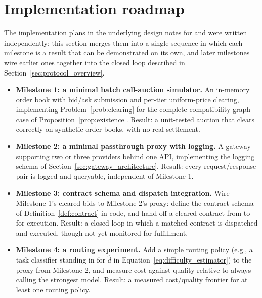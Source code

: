 \section{Implementation roadmap}
\label{sec:roadmap}

The implementation plans in the underlying design notes for
\NoesisMarket{} and \NoesisServer{} were written independently; this
section merges them into a single sequence in which each milestone is a
result that can be demonstrated on its own, and later milestones wire
earlier ones together into the closed loop described in
Section~\ref{sec:protocol_overview}.

\begin{itemize}
  \item \textbf{Milestone 1: a minimal batch call-auction simulator.} An
    in-memory order book with bid/ask submission and per-tier
    uniform-price clearing, implementing Problem~\ref{prob:clearing} for
    the complete-compatibility-graph case of
    Proposition~\ref{prop:existence}. Result: a unit-tested auction that
    clears correctly on synthetic order books, with no real settlement.

  \item \textbf{Milestone 2: a minimal passthrough proxy with logging.}
    A gateway supporting two or three providers behind one API,
    implementing the logging schema of
    Section~\ref{sec:gateway_architecture}. Result: every request/response
    pair is logged and queryable, independent of Milestone 1.

  \item \textbf{Milestone 3: contract schema and dispatch integration.}
    Wire Milestone 1's cleared bids to Milestone 2's proxy: define the
    contract schema of Definition~\ref{def:contract} in code, and hand
    off a cleared contract from \NoesisMarket{} to \NoesisServer{} for
    execution. Result: a closed loop in which a matched contract is
    dispatched and executed, though not yet monitored for fulfillment.

  \item \textbf{Milestone 4: a routing experiment.} Add a simple routing
    policy (e.g., a task classifier standing in for
    $\hat d$ in Equation~\eqref{eq:difficulty_estimator}) to the proxy
    from Milestone 2, and measure cost against quality relative to
    always calling the strongest model. Result: a measured cost/quality
    frontier for at least one routing policy.


\end{itemize}
